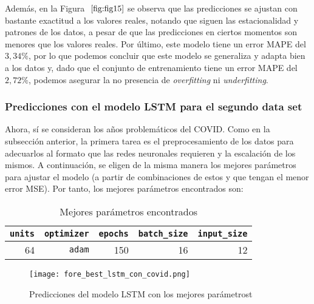 \documentclass[12pt,twoside]{article}
\begin{document}
Además, en la Figura $~\ref{fig:fig15}$ se observa que las predicciones se ajustan con bastante exactitud a los valores reales, notando que siguen las estacionalidad y patrones de los datos, a pesar de que las predicciones en ciertos momentos son menores que los valores reales. Por último, este modelo tiene un error MAPE del $3,34\%$, por lo que podemos concluir que este modelo se generaliza y adapta bien a los datos y, dado que el conjunto de entrenamiento tiene un error MAPE del $2,72\%$, podemos asegurar la no presencia de \textit{overfitting} ni \textit{underfitting}.

\subsubsection{Predicciones con el modelo LSTM para el segundo data set}\label{sec:20}

Ahora, sí se consideran los años problemáticos del COVID. Como en la subsección anterior, la primera tarea es el preprocesamiento de los datos para adecuarlos al formato que las redes neuronales requieren y la escalación de los mismos. A continuación, se eligen de la misma manera los mejores parámetros para ajustar el modelo (a partir de combinaciones de estos y que tengan el menor error MSE). Por tanto, los mejores parámetros encontrados son: 

\begin{table}[ht] 
\centering
\begin{tabular}{rrrrr} 
  \hline
 \texttt{units} & \texttt{optimizer} & \texttt{epochs} & \texttt{batch\_size} & \texttt{input\_size} \\ 
  \hline
64 & \texttt{adam} & 150 & 16 & 12 \\ 
   \hline
\end{tabular}
\caption{Mejores parámetros encontrados} \label{tab:01}
\end{table}

\begin{figure}[h]
    \centering
    \texttt{[image: fore\_best\_lstm\_con\_covid.png]}
    \caption{Predicciones del modelo LSTM con los mejores parámetrost} 
    \label{fig:fig16}
\end{figure}

\end{document}
